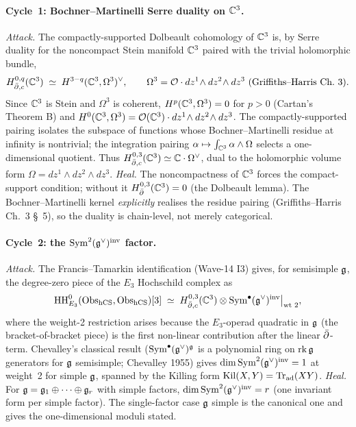 \paragraph{Cycle~1: Bochner--Martinelli Serre duality on $\mathbb{C}^3$.}
\emph{Attack.}  The compactly-supported Dolbeault cohomology of $\mathbb{C}^3$
is, by Serre duality for the noncompact Stein manifold $\mathbb{C}^3$ paired
with the trivial holomorphic bundle,
\[
  H^{0,q}_{\bar\partial,c}(\mathbb{C}^3)
  \;\simeq\;
  H^{3-q}(\mathbb{C}^3,\Omega^3)^\vee,
  \qquad
  \Omega^3=\mathcal{O}\cdot dz^1\!\wedge dz^2\!\wedge dz^3
  \text{ (Griffiths--Harris Ch.~3).}
\]
Since $\mathbb{C}^3$ is Stein and $\Omega^3$ is coherent, $H^p(\mathbb{C}^3,\Omega^3)=0$
for $p>0$ (Cartan's Theorem B) and $H^0(\mathbb{C}^3,\Omega^3)=\mathcal{O}(\mathbb{C}^3)\cdot
dz^1\!\wedge dz^2\!\wedge dz^3$.  The compactly-supported pairing
isolates the subspace of functions whose Bochner--Martinelli residue
at infinity is nontrivial; the integration pairing
$\alpha\mapsto\int_{\mathbb{C}^3}\alpha\wedge\Omega$ selects a one-dimensional
quotient.  Thus
$H^{0,3}_{\bar\partial,c}(\mathbb{C}^3)\simeq\mathbb{C}\cdot\Omega^\vee$, dual to the
holomorphic volume form $\Omega=dz^1\wedge dz^2\wedge dz^3$.
\emph{Heal.}  The noncompactness of $\mathbb{C}^3$ forces the compact-support
condition; without it $H^{0,3}_{\bar\partial}(\mathbb{C}^3)=0$ (the Dolbeault lemma).
The Bochner--Martinelli kernel \emph{explicitly} realises the
residue pairing (Griffiths--Harris Ch.~3 \S~5), so the duality is
chain-level, not merely categorical.

\paragraph{Cycle~2: the $\mathrm{Sym}^2(\mathfrak{g}^\vee)^{\mathrm{inv}}$ factor.}
\emph{Attack.}  The Francis--Tamarkin identification (Wave-14 I3)
gives, for semisimple $\mathfrak{g}$, the degree-zero piece of the $E_3$
Hochschild complex as
\[
  \mathrm{HH}^0_{E_3}(\mathrm{Obs}_{\mathrm{hCS}},\mathrm{Obs}_{\mathrm{hCS}})[3]
  \;\simeq\;
  H^{0,3}_{\bar\partial,c}(\mathbb{C}^3)\otimes\mathrm{Sym}^\bullet(\mathfrak{g}^\vee)^{\mathrm{inv}}\big|_{\text{wt 2}},
\]
where the weight-2 restriction arises because the $E_3$-operad
quadratic in $\mathfrak{g}$ (the bracket-of-bracket piece) is the first
non-linear contribution after the linear $\bar\partial$-term.  Chevalley's
classical result ($\mathrm{Sym}^\bullet(\mathfrak{g}^\vee)^{\mathfrak{g}}$ is a polynomial ring on
$\mathrm{rk}\,\mathfrak{g}$ generators for $\mathfrak{g}$ semisimple; Chevalley 1955) gives
$\dim\mathrm{Sym}^2(\mathfrak{g}^\vee)^{\mathrm{inv}}=1$ at weight~2 for simple $\mathfrak{g}$, spanned
by the Killing form $\mathrm{Kil}(X,Y)=\mathrm{Tr}_{\mathrm{ad}}(XY)$.
\emph{Heal.}  For $\mathfrak{g}=\mathfrak{g}_1\oplus\cdots\oplus\mathfrak{g}_r$ with simple
factors, $\dim\mathrm{Sym}^2(\mathfrak{g}^\vee)^{\mathrm{inv}}=r$ (one invariant form per
simple factor).  The single-factor case $\mathfrak{g}$ simple is the canonical
one and gives the one-dimensional moduli stated.

